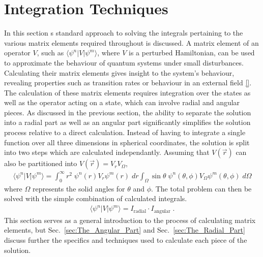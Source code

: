     \section{Integration Techniques} \label{sec:Integration_Techniques}
        In this section s standard approach to solving the integrals pertaining to the various matrix elements required throughout is discussed. A matrix element of an operator $V$, such as $\langle\psi^n \vert V \vert \psi^m \rangle$, where $V$ is a perturbed Hamiltonian, can be used to approximate the behaviour of quantum systems under small disturbances. Calculating their matrix elements gives insight to the system's behaviour, revealing properties such as transition rates or behaviour in an external field \ref{}. The calculation of these matrix elements requires integration over the states as well as the operator acting on a state, which can involve radial and angular pieces. As discussed in the previous section, the ability to separate the solution into a radial part as well as an angular part significantly simplifies the solution process relative to a direct calculation. Instead of having to integrate a single function over all three dimensions in spherical coordinates, the solution is split into two steps which are calculated independantly. Assuming that $V(\vec{r})$ can also be partitioned into $V(\vec{r}) = V_r V_\Omega$,
        \begin{align}
            \langle \psi^n \vert V \vert \psi^m \rangle = \int_{0}^{\infty} r^2 \; \psi^n(r) V_r \psi^m(r) \; dr \int_\Omega \sin \theta \; \psi^n(\theta, \phi) V_\Omega \psi^m(\theta, \phi) \; d\Omega
        \end{align}
        \noindent where $\Omega$ represents the solid angles for $\theta$ and $\phi$. The total problem can then be solved with the simple combination of calculated integrals.
        \begin{align}
             \langle \psi^n \vert V \vert \psi^m \rangle = I_{\text{radial}} \cdot I_{\text{angular}}\;.
        \end{align}
        \noindent This section serves as a general introduction to the process of calculating matrix elements, but Sec.~\ref{sec:The_Angular_Part} and Sec.~\ref{sec:The_Radial_Part} discuss further the specifics and techniques used to calculate each piece of the solution.

